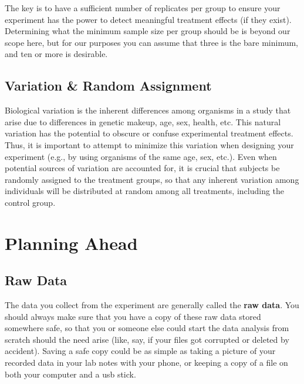 \documentclass[
]{book}
\begin{document}
The key is to have a sufficient number of replicates per group to ensure your experiment has the power to detect meaningful treatment effects (if they exist). Determining what the minimum sample size per group should be is beyond our scope here, but for our purposes you can assume that three is the bare minimum, and ten or more is desirable.

\hypertarget{variation-random-assignment}{%
\subsection*{Variation \& Random Assignment}\label{variation-random-assignment}}

Biological variation is the inherent differences among organisms in a study that arise due to differences in genetic makeup, age, sex, health, etc. This natural variation has the potential to obscure or confuse experimental treatment effects. Thus, it is important to attempt to minimize this variation when designing your experiment (e.g., by using organisms of the same age, sex, etc.). Even when potential sources of variation are accounted for, it is crucial that subjects be randomly assigned to the treatment groups, so that any inherent variation among individuals will be distributed at random among all treatments, including the control group.

\hypertarget{planning-ahead}{%
\section*{Planning Ahead}\label{planning-ahead}}

\hypertarget{raw-data}{%
\subsection*{Raw Data}\label{raw-data}}

The data you collect from the experiment are generally called the \textbf{raw data}. You should always make sure that you have a copy of these raw data stored somewhere safe, so that you or someone else could start the data analysis from scratch should the need arise (like, say, if your files got corrupted or deleted by accident). Saving a safe copy could be as simple as taking a picture of your recorded data in your lab notes with your phone, or keeping a copy of a file on both your computer and a usb stick.
\end{document}
